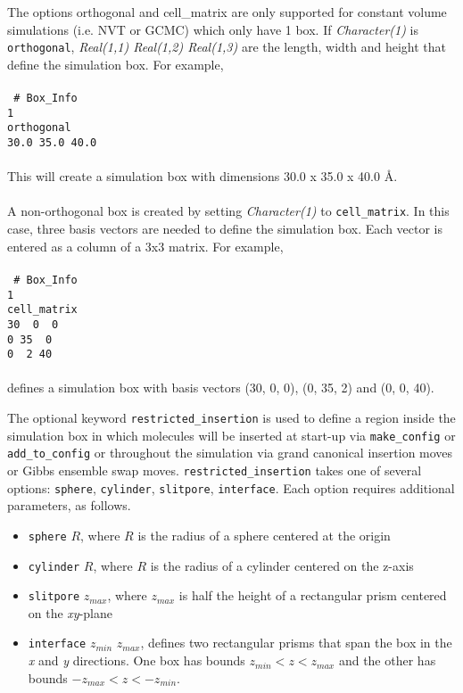 The options orthogonal and cell\_matrix are only supported for constant volume simulations
(i.e. NVT or GCMC) which only have 1 box.
If {\it Character(1)} is \texttt{orthogonal}, \emph{Real(1,1) Real(1,2) Real(1,3)} are the length,
width and height that define the simulation box. For example, \\ \\
%
\texttt{
\# Box\_Info \\
 1 \\
 orthogonal \\
 30.0 35.0 40.0} \\ \\
%
This will create a simulation box with dimensions 30.0 x 35.0 x 40.0 \AA. \\ \\
%
A non-orthogonal box is created by setting {\it Character(1)} to \texttt{cell\_matrix}.
In this case, three basis vectors are needed to define the simulation box.
Each vector is entered as a column of a 3x3 matrix.
For example, \\ \\
%
\texttt{
\# Box\_Info \\
 1 \\
 cell\_matrix \\
 30 ~0 ~0\\
\hspace*{0.5em}0 35 ~0\\
\hspace*{0.5em}0 ~2 40} \\ \\
%
defines a simulation box with basis vectors (30, 0, 0), (0, 35, 2) and (0, 0, 40).

The optional keyword \texttt{restricted\_insertion} is used to define a region inside the simulation box
in which molecules will be inserted at start-up via \texttt{make\_config} or \texttt{add\_to\_config}
or throughout the simulation via grand canonical insertion moves or Gibbs ensemble swap moves.
\texttt{restricted\_insertion} takes one of several options:
\texttt{sphere}, \texttt{cylinder}, \texttt{slitpore}, \texttt{interface}.
Each option requires additional parameters, as follows.

\begin{itemize}
	\item \texttt{sphere} $R$,
	where $R$ is the radius of a sphere centered at the origin
	\item \texttt{cylinder} $R$,
	where $R$ is the radius of a cylinder centered on the z-axis
	\item \texttt{slitpore} $z_{max}$,
	where $z_{max}$ is half the height of a rectangular prism centered on the {\it xy}-plane
	\item \texttt{interface} $z_{min}$ $z_{max}$,
	defines two rectangular prisms that span the box in the {\it x} and {\it y} directions.
	One box has bounds $z_{min} < z < z_{max}$ and the other has bounds $-z_{max} < z < -z_{min}$.
\end{itemize}


